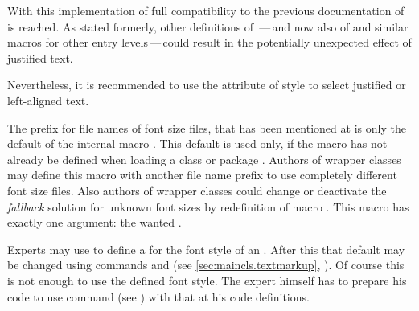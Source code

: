 With this implementation of  full compatibility to the
previous documentation of  is reached. As
stated formerly, other definitions of \,---\,and now
also of  and similar macros for other entry
levels\,---\,could result in the potentially unexpected effect of justified
text.

Nevertheless, it is recommended to use the attribute of style 
to select justified or left-aligned text.%
\EndIndexGroup



\begin{Declaration}
\end{Declaration}
The prefix  for file names of font size files, that has been
mentioned at
 is only the default of the
internal macro . This
default is used only, if the macro has not already be defined when loading a
\KOMAScript{} class or package . Authors of wrapper classes
may define this macro with another file name prefix to use completely
different font size files. Also authors of wrapper classes
could change or deactivate the \emph{fallback} solution for unknown font sizes
by redefinition of macro
. This macro has
exactly one argument: the wanted .%
%
\EndIndexGroup


\begin{Declaration}
\end{Declaration}
Experts may use  to define a  for the font
style of an . After this that default may be changed using
commands  and
 (see \autoref{sec:maincls.textmarkup},
). Of course this is not enough to use
the defined font style. The expert himself has to prepare his code to use
command %
 (see
) with that  at his code
definitions.

